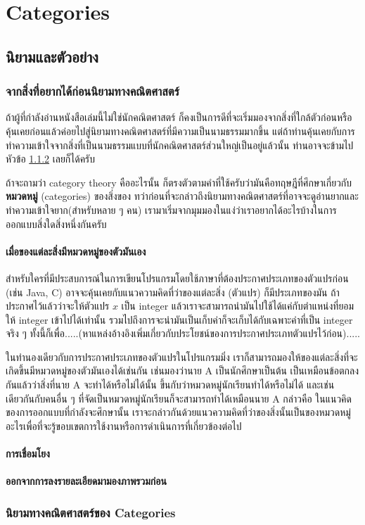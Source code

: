 \chapter{Categories}
\section{นิยามและตัวอย่าง}
\subsection{จากสิ่งที่อยากได้ก่อนนิยามทางคณิตศาสตร์}

ถ้าผู้ที่กำลังอ่านหนังสือเล่มนี้ไม่ใช่นักคณิตศาสตร์ ก็คงเป็นการดีที่จะเริ่มมองจากสิ่งที่ใกล้ตัวก่อนหรือคุ้นเคยก่อนแล้วค่อยไปสู่นิยามทางคณิตศาสตร์ที่มีความเป็นนามธรรมมากขึ้น แต่ถ้าท่านคุ้นเคยกับการทำความเข้าใจจากสิ่งที่เป็นนามธรรมแบบที่นักคณิตศาสตร์ส่วนใหญ่เป็นอยู่แล้วนั้น ท่านอาจจะข้ามไปหัวข้อ \ref{def_cat} เลยก็ได้ครับ

ถ้าจะถามว่า category theory คืออะไรนั้น ก็ตรงตัวตามคำที่ใช้ครับว่ามันคือทฤษฎีที่ศึกษาเกี่ยวกับ \textbf{หมวดหมู่} (categories)  ของสิ่งของ ทว่าก่อนที่จะกล่าวถึงนิยามทางคณิตศาสตร์ที่อาจจะดูอ่านยากและทำความเข้าใจยาก(สำหรับหลาย ๆ คน) เรามาเริ่มจากมุมมองในแง่ว่าเราอยากได้อะไรบ้างในการออกแบบสิ่งใดสิ่งหนึ่งกันครับ

\subsubsection{เมื่อของแต่ละสิ่งมีหมวดหมู่ของตัวมันเอง}
สำหรับใครที่มีประสบการณ์ในการเขียนโปรแกรมโดยใช้ภาษาที่ต้องประกาศประเภทของตัวแปรก่อน (เช่น Java, C) อาจจะคุ้นเคยกับแนวความคิดที่ว่าของแต่ละสิ่ง (ตัวแปร) ก็มีประเภทของมัน ถ้าประกาศไว้แล้วว่าจะให้ตัวแปร $x$ เป็น integer แล้วเราจะสามารถนำมันไปใช้ได้แค่กับตำแหน่งที่ยอมให้ integer เข้าไปได้เท่านั้น รวมไปถึงการจะนำมันเป็นเก็บค่าก็จะเก็บได้กับเฉพาะค่าที่เป็น integer จริง ๆ ทั้งนี้ก็เพื่อ.....(หาแหล่งอ้างอิงเพิ่มเกี่ยวกับประโยชน์ของการประกาศประเภทตัวแปรไว้ก่อน).....

ในทำนองเดียวกับการประกาศประเภทของตัวแปรในโปรแกรมมิ่ง เราก็สามารถมองให้ของแต่ละสิ่งที่จะเกิดขึ้นมีหมวดหมู่ของตัวมันเองได้เช่นกัน เช่นมองว่านาย A เป็นนักศึกษาเป็นต้น เป็นเหมือนข้อตกลงกันแล้วว่าสิ่งที่นาย A จะทำได้หรือไม่ได้นั้น ขึ้นกับว่าหมวดหมู่นักเรียนทำได้หรือไม่ได้ และเช่นเดียวกันกับคนอื่น ๆ ที่จัดเป็นหมวดหมู่นักเรียนก็จะสามารถทำได้เหมือนนาย A กล่าวคือ ในแนวคิดของการออกแบบที่กำลังจะศึกษานั้น เราจะกล่าวกันด้วยแนวความคิดที่ว่าของสิ่งนั้นเป็นของหมวดหมู่อะไรเพื่อที่จะรู้ขอบเขตการใช้งานหรือการดำเนินการที่เกี่ยวข้องต่อไป
\subsubsection{การเชื่อมโยง}
\lipsum[1]
\subsubsection{ออกจากการลงรายละเอียดมามองภาพรวมก่อน}
\lipsum[1]
\subsection{นิยามทางคณิตศาสตร์ของ Categories} \label{def_cat}
~